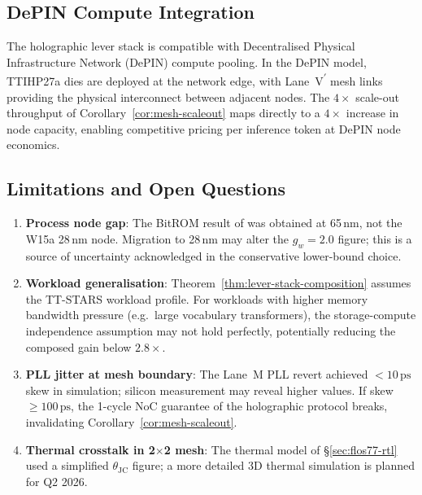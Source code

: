 \subsection{DePIN Compute Integration}

The holographic lever stack is compatible with Decentralised Physical Infrastructure
Network (DePIN) compute pooling.
In the DePIN model, TTIHP27a dies are deployed at the network edge,
with Lane~V\textsuperscript{$\prime$} mesh links providing the physical
interconnect between adjacent nodes.
The $4\times$ scale-out throughput of Corollary~\ref{cor:mesh-scaleout}
maps directly to a $4\times$ increase in node capacity, enabling
competitive pricing per inference token at DePIN node economics.

\subsection{Limitations and Open Questions}

\begin{enumerate}
  \item \textbf{Process node gap}: The BitROM result of \cite{bitrom_2025}
        was obtained at 65\,nm, not the W15a 28\,nm node.
        Migration to 28\,nm may alter the $g_w = 2.0$ figure; this is a source
        of uncertainty acknowledged in the conservative lower-bound choice.

  \item \textbf{Workload generalisation}: Theorem~\ref{thm:lever-stack-composition}
        assumes the TT-STARS workload profile.
        For workloads with higher memory bandwidth pressure (e.g.\ large vocabulary
        transformers), the storage-compute independence assumption may not hold
        perfectly, potentially reducing the composed gain below $2.8\times$.

  \item \textbf{PLL jitter at mesh boundary}: The Lane~M PLL revert achieved
        $< 10\,\text{ps}$ skew in simulation; silicon measurement may reveal
        higher values.  If skew $\geq 100\,\text{ps}$, the 1-cycle NoC guarantee
        of the holographic protocol breaks, invalidating Corollary~\ref{cor:mesh-scaleout}.

  \item \textbf{Thermal crosstalk in 2$\times$2 mesh}: The thermal model of
        §\ref{sec:flos77-rtl} used a simplified $\theta_{\text{JC}}$ figure;
        a more detailed 3D thermal simulation is planned for Q2 2026.
\end{enumerate}

